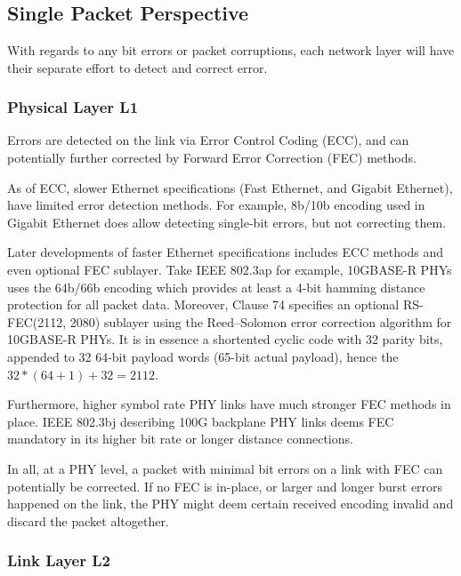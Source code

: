 \documentclass[12pt]{article}
\begin{document}
\section{}

\subsection{Single Packet Perspective}

With regards to any bit errors or packet corruptions, each network layer will have their separate effort to detect and correct error.

\subsubsection{Physical Layer L1}

Errors are detected on the link via Error Control Coding (ECC), and can potentially further corrected by Forward Error Correction (FEC) methods. 

As of ECC, slower Ethernet specifications (Fast Ethernet, and Gigabit Ethernet), have limited error detection methods. For example, 8b/10b encoding used in Gigabit Ethernet does allow detecting single-bit errors, but not correcting them. 

Later developments of faster Ethernet specifications includes ECC methods and even optional FEC sublayer. Take IEEE 802.3ap for example, 10GBASE-R PHYs uses the 64b/66b encoding which provides at least a 4-bit hamming distance protection for all packet data. Moreover, Clause 74 specifies an optional RS-FEC(2112, 2080) sublayer using the Reed–Solomon error correction algorithm for 10GBASE-R PHYs. It is in essence a shortented cyclic code with 32 parity bits, appended to 32 64-bit payload words (65-bit actual payload), hence the $32*(64 + 1) + 32 = 2112$.

Furthermore, higher symbol rate PHY links have much stronger FEC methods in place. IEEE 802.3bj describing 100G backplane PHY links deems FEC mandatory in its higher bit rate or longer distance connections.

In all, at a PHY level, a packet with minimal bit errors on a link with FEC can potentially be corrected. If no FEC is in-place, or larger and longer burst errors happened on the link, the PHY might deem certain received encoding invalid and discard the packet altogether.

\subsubsection{Link Layer L2}
\end{document}

